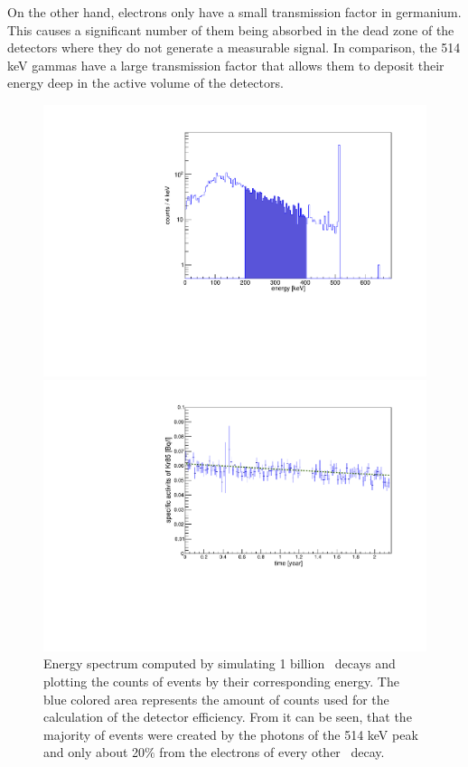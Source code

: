 \documentclass[encoding=utf8,british]{tumphthesis}
\begin{document}
On the other hand, electrons only have a small transmission factor in germanium.
This causes a significant number of them being absorbed in the dead zone of the detectors where they do not generate a measurable signal.
In comparison, the 514 keV gammas have a large transmission factor that allows them to deposit their energy deep in the active volume of the detectors.
\\
\begin{figure}[t!]
	\centering
	\begin{minipage}[t]{.475\textwidth}
		\centering
		\includegraphics[width=\textwidth]{./Bilder/Sim1Phasenraum.pdf}
		\caption{
			Energy spectrum computed by simulating 1 billion \Kr\ decays and plotting the counts of events by their corresponding energy.
			The blue colored area represents the amount of counts used for the calculation of the detector efficiency.
			From it can be seen, that the majority of events were created by the photons of the 514 keV peak and only about 20$\%$ from the electrons of every other \Kr\ decay.
			}
		\label{fig:Sim1Spektrum}
	\end{minipage}\hfill%
	\begin{minipage}[t]{.475\textwidth}
		\centering
		\includegraphics[width=\textwidth]{./Bilder/Aktivitaet.pdf}

\end{minipage}
\end{figure}
\end{document}
